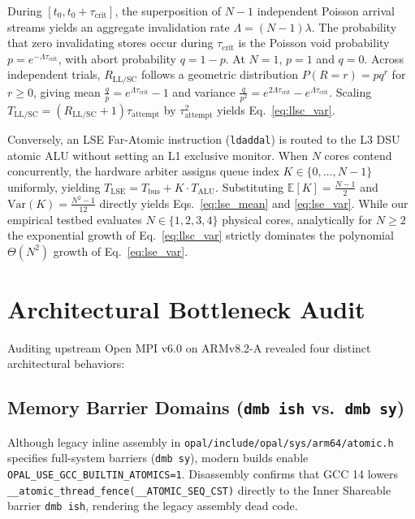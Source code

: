 \documentclass[conference]{IEEEtran}
\begin{document}
\begin{IEEEproof}
During $[t_0, t_0 + \tau_{\text{crit}}]$, the superposition of $N-1$ independent Poisson arrival streams yields an aggregate invalidation rate $\Lambda = (N-1)\lambda$. The probability that zero invalidating stores occur during $\tau_{\text{crit}}$ is the Poisson void probability $p = e^{-\Lambda \tau_{\text{crit}}}$, with abort probability $q = 1 - p$. At $N=1$, $p = 1$ and $q = 0$. Across independent trials, $R_{\text{LL/SC}}$ follows a geometric distribution $P(R = r) = p q^r$ for $r \ge 0$, giving mean $\frac{q}{p} = e^{\Lambda \tau_{\text{crit}}} - 1$ and variance $\frac{q}{p^2} = e^{2\Lambda \tau_{\text{crit}}} - e^{\Lambda \tau_{\text{crit}}}$. Scaling $T_{\text{LL/SC}} = (R_{\text{LL/SC}} + 1)\tau_{\text{attempt}}$ by $\tau_{\text{attempt}}^2$ yields Eq.~\eqref{eq:llsc_var}.

Conversely, an LSE Far-Atomic instruction (\texttt{ldaddal}) is routed to the L3 DSU atomic ALU without setting an L1 exclusive monitor. When $N$ cores contend concurrently, the hardware arbiter assigns queue index $K \in \{0, \dots, N-1\}$ uniformly, yielding $T_{\text{LSE}} = T_{\text{bus}} + K \cdot T_{\text{ALU}}$. Substituting $\mathbb{E}[K] = \frac{N-1}{2}$ and $\mathrm{Var}(K) = \frac{N^2-1}{12}$ directly yields Eqs.~\eqref{eq:lse_mean} and \eqref{eq:lse_var}. While our empirical testbed evaluates $N \in \{1,2,3,4\}$ physical cores, analytically for $N \ge 2$ the exponential growth of Eq.~\eqref{eq:llsc_var} strictly dominates the polynomial $\Theta(N^2)$ growth of Eq.~\eqref{eq:lse_var}.
\end{IEEEproof}

\section{Architectural Bottleneck Audit}
Auditing upstream Open MPI v6.0 on ARMv8.2-A revealed four distinct architectural behaviors:

\subsection{Memory Barrier Domains (\texttt{dmb ish} vs.\ \texttt{dmb sy})}
Although legacy inline assembly in \texttt{opal/include/opal/sys/arm64/atomic.h} specifies full-system barriers (\texttt{dmb sy}), modern builds enable \texttt{OPAL\_USE\_GCC\_BUILTIN\_ATOMICS=1}. Disassembly confirms that GCC 14 lowers \texttt{\_\_atomic\_thread\_fence(\_\_ATOMIC\_SEQ\_CST)} directly to the Inner Shareable barrier \texttt{dmb ish}, rendering the legacy assembly dead code.
\end{document}
